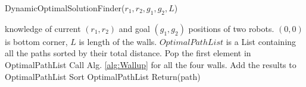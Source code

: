 \begin{algorithm}
\caption{DynamicOptimalSolutionFinder($r_1,r_2,g_1,g_2,L$)}\label{alg:Wallup}
\begin{algorithmic}[1]
\Require knowledge of current $(r_1,r_2)$ and goal $(g_1,g_2)$ positions of  two robots. 
$(0,0)$ is bottom corner,
 $L$ is length of the walls. 
 $OptimalPathList$ is a List containing all the paths sorted by their total distance. 
\State Pop the first element in OptimalPathList
\State Call Alg. \ref{alg:Wallup} for all the four walls.
\State Add the results to OptimalPathList
\State Sort OptimalPathList
\EndWhile
\State Return(path)
\end{algorithmic}
\end{algorithm}






